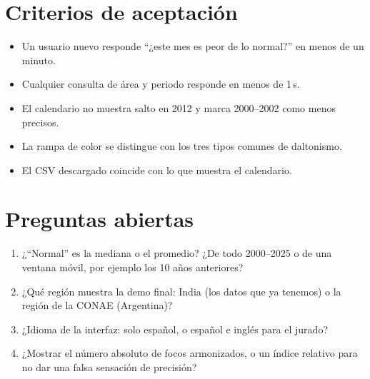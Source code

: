 \documentclass[11pt,a4paper]{article}
\begin{document}
\section{Criterios de aceptación}

\begin{itemize}
  \item Un usuario nuevo responde ``¿este mes es peor de lo normal?'' en menos de un minuto.
  \item Cualquier consulta de área y periodo responde en menos de 1\,s.
  \item El calendario no muestra salto en 2012 y marca 2000--2002 como menos precisos.
  \item La rampa de color se distingue con los tres tipos comunes de daltonismo.
  \item El CSV descargado coincide con lo que muestra el calendario.
\end{itemize}

\section{Preguntas abiertas}

\begin{enumerate}
  \item ¿``Normal'' es la mediana o el promedio? ¿De todo 2000--2025 o de una ventana
        móvil, por ejemplo los 10 años anteriores?
  \item ¿Qué región muestra la demo final: India (los datos que ya tenemos) o la región
        de la CONAE (Argentina)?
  \item ¿Idioma de la interfaz: solo español, o español e inglés para el jurado?
  \item ¿Mostrar el número absoluto de focos armonizados, o un índice relativo para no
        dar una falsa sensación de precisión?
\end{enumerate}
\end{document}
